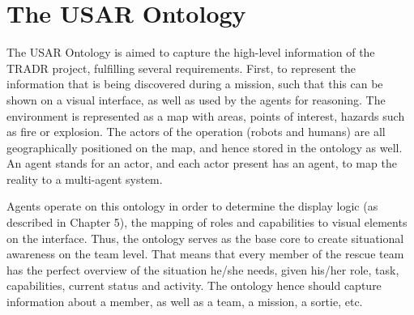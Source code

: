 \chapter{The USAR Ontology}
The USAR Ontology is aimed to capture the high-level information of the TRADR project, fulfilling several requirements. First, to represent the information that is being discovered during a mission, such that this can be shown on a visual interface, as well as used by the agents for reasoning. 
The environment is represented as a map with areas, points of interest, hazards such as fire or explosion. The actors of the operation (robots and humans) are all geographically positioned on the map, and hence stored in the ontology as well. An agent stands for an actor, and each actor present has an agent, to map the reality to a multi-agent system. 

Agents operate on this ontology in order to determine the display logic (as described in Chapter 5), the mapping of roles and capabilities to visual elements on the interface. Thus, the ontology serves as the base core to create situational awareness on the team level. That means that every member of the rescue team has the perfect overview of the situation he/she needs, given his/her role, task, capabilities, current status and activity. The ontology hence should capture information about a member, as well as a team, a mission, a sortie, etc.
 


